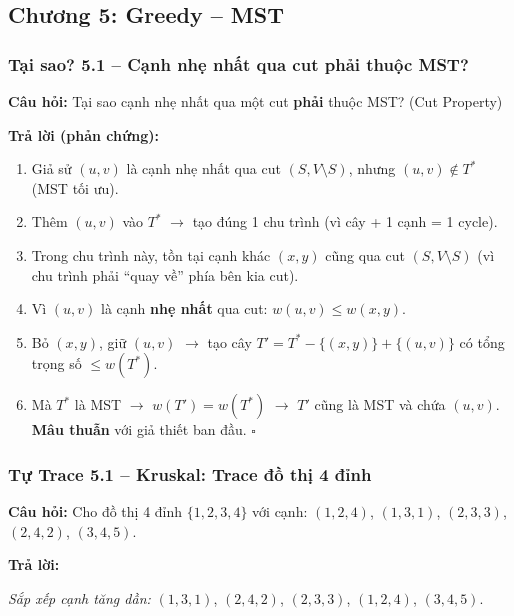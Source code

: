\documentclass[10pt]{article}
\begin{document}
\subsection{Chương 5: Greedy -- MST}

\subsubsection{Tại sao? 5.1 -- Cạnh nhẹ nhất qua cut phải thuộc MST?}\label{whyans:5.1}

\textbf{Câu hỏi:} Tại sao cạnh nhẹ nhất qua một cut \textbf{phải} thuộc MST? (Cut Property)

\textbf{Trả lời (phản chứng):}
\begin{enumerate}
\item Giả sử $(u,v)$ là cạnh nhẹ nhất qua cut $(S, V \setminus S)$, nhưng $(u,v) \notin T^*$ (MST tối ưu).
\item Thêm $(u,v)$ vào $T^*$ $\to$ tạo đúng 1 chu trình (vì cây + 1 cạnh = 1 cycle).
\item Trong chu trình này, tồn tại cạnh khác $(x,y)$ cũng qua cut $(S, V \setminus S)$ (vì chu trình phải ``quay về'' phía bên kia cut).
\item Vì $(u,v)$ là cạnh \textbf{nhẹ nhất} qua cut: $w(u,v) \leq w(x,y)$.
\item Bỏ $(x,y)$, giữ $(u,v)$ $\to$ tạo cây $T' = T^* - \{(x,y)\} + \{(u,v)\}$ có tổng trọng số $\leq w(T^*)$.
\item Mà $T^*$ là MST $\to$ $w(T') = w(T^*)$ $\to$ $T'$ cũng là MST và chứa $(u,v)$. \textbf{Mâu thuẫn} với giả thiết ban đầu. $\square$
\end{enumerate}

\subsubsection{Tự Trace 5.1 -- Kruskal: Trace đồ thị 4 đỉnh}\label{traceans:5.1}

\textbf{Câu hỏi:} Cho đồ thị 4 đỉnh $\{1,2,3,4\}$ với cạnh: $(1,2,4)$, $(1,3,1)$, $(2,3,3)$, $(2,4,2)$, $(3,4,5)$.

\textbf{Trả lời:}

\textit{Sắp xếp cạnh tăng dần:} $(1,3,1)$, $(2,4,2)$, $(2,3,3)$, $(1,2,4)$, $(3,4,5)$.
\end{document}
